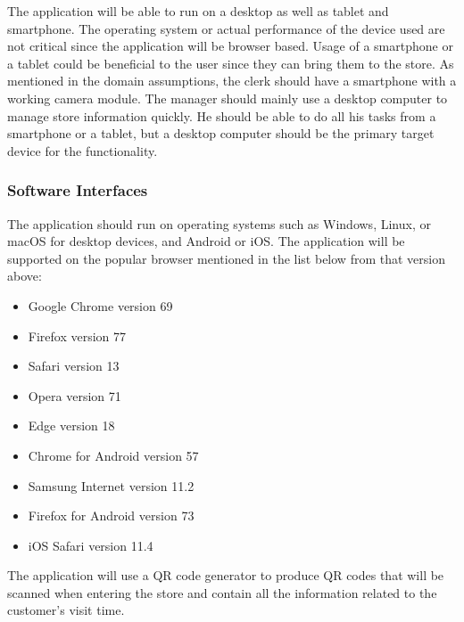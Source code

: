 The application will be able to run on a desktop as well as tablet and smartphone.
The operating system or actual performance of the device used are not critical since the application will be browser based.
Usage of a smartphone or a tablet could be beneficial to the user since they can bring them to the store.
As mentioned in the domain assumptions, the clerk should have a smartphone with a working camera module.
The manager should mainly use a desktop computer to manage store information quickly.
He should be able to do all his tasks from a smartphone or a tablet, but a desktop computer should be the primary target device for the functionality.

\subsubsection{Software Interfaces}


The application should run on operating systems such as Windows, Linux, or macOS for desktop devices, and Android or iOS.
The application will be supported on the popular browser mentioned in the list below from that version above:
\begin{itemize}
    \item {Google Chrome} version 69
    \item {Firefox} version 77
    \item {Safari} version 13
    \item {Opera} version 71
    \item {Edge} version 18
    \item {Chrome for Android} version 57
    \item {Samsung Internet} version 11.2
    \item {Firefox for Android} version 73
    \item {iOS Safari} version 11.4
\end{itemize}
The application will use a QR code generator to produce QR codes that will be scanned when entering the store and contain all the information related to the customer's visit time.

